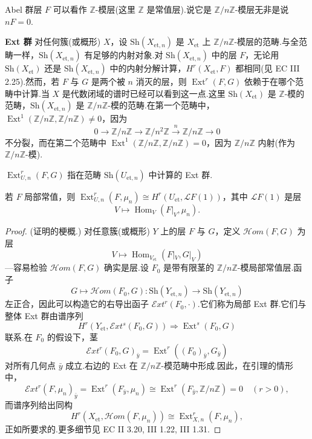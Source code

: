 Abel 群层 $F$ 可以看作 $\mathbb{Z}$-模层(这里 $\mathbb{Z}$ 是常值层).说它是 $\mathbb{Z}/n\mathbb{Z}$-模层无非是说 $nF = 0$.

\textbf{Ext 群} 对任何簇(或概形) $X$，设 $\mathrm{Sh}(X_{\mathrm{et}, n})$ 是 $X_{\mathrm{et}}$ 上 $\mathbb{Z}/n\mathbb{Z}$-模层的范畴.与全范畴一样，$\mathrm{Sh}(X_{\mathrm{et}, n})$ 有足够的内射对象.对 $\mathrm{Sh}(X_{\mathrm{et}, n})$ 中的层 $F$，无论用 $\mathrm{Sh}(X_{\mathrm{et}})$ 还是 $\mathrm{Sh}(X_{\mathrm{et}, n})$ 中的内射分解计算，$H^{r}(X_{\mathrm{et}}, F)$ 都相同(见 EC III 2.25).然而，若 $F$ 与 $G$ 是两个被 $n$ 消灭的层，则 $\operatorname{Ext}^{r}(F, G)$ 依赖于在哪个范畴中计算.当 $X$ 是代数闭域的谱时已经可以看到这一点.这里 $\mathrm{Sh}(X_{\mathrm{et}})$ 是 $\mathbb{Z}$-模的范畴，$\mathrm{Sh}(X_{\mathrm{et}, n})$ 是 $\mathbb{Z}/n\mathbb{Z}$-模的范畴.在第一个范畴中，$\operatorname{Ext}^{1}(\mathbb{Z}/n\mathbb{Z}, \mathbb{Z}/n\mathbb{Z}) \neq 0$，因为
\[
0 \to \mathbb{Z}/n\mathbb{Z} \to \mathbb{Z}/n^{2}\mathbb{Z} \xrightarrow{n} \mathbb{Z}/n\mathbb{Z} \to 0
\]
不分裂，而在第二个范畴中 $\operatorname{Ext}^{1}(\mathbb{Z}/n\mathbb{Z}, \mathbb{Z}/n\mathbb{Z}) = 0$，因为 $\mathbb{Z}/n\mathbb{Z}$ 内射(作为 $\mathbb{Z}/n\mathbb{Z}$-模).

$\operatorname{Ext}^{r}_{U, n}(F, G)$ 指在范畴 $\mathrm{Sh}(U_{\mathrm{et}, n})$ 中计算的 Ext 群.

\begin{lemma}\label{lem:14.21}
若 $F$ 局部常值，则 $\operatorname{Ext}^{r}_{U, n}(F, \mu_n) \cong H^{r}(U_{\mathrm{et}}, \mathcal{L}F(1))$，其中 $\mathcal{L}F(1)$ 是层
\[
V \mapsto \operatorname{Hom}_{V}(F|_{V}, \mu_n).
\]
\end{lemma}

\begin{proof}
(证明的梗概.) 对任意簇(或概形) $Y$ 上的层 $F$ 与 $G$，定义 $\mathcal{H}om(F, G)$ 为层
\[
V \mapsto \operatorname{Hom}_{V_{\mathrm{et}}}(F|_{V}, G|_{V})
\]
---容易检验 $\mathcal{H}om(F, G)$ 确实是层.设 $F_0$ 是带有限茎的 $\mathbb{Z}/n\mathbb{Z}$-模局部常值层.函子
\[
G \mapsto \mathcal{H}om(F_0, G) \colon \mathrm{Sh}(Y_{\mathrm{et}, n}) \to \mathrm{Sh}(Y_{\mathrm{et}, n})
\]
左正合，因此可以构造它的右导出函子 $\mathcal{E}xt^{r}(F_0, \cdot)$.它们称为局部 Ext 群.它们与整体 Ext 群由谱序列
\[
H^{r}(Y_{\mathrm{et}}, \mathcal{E}xt^{s}(F_0, G)) \Rightarrow \operatorname{Ext}^{s}(F_0, G)
\]
联系.在 $F_0$ 的假设下，茎
\[
\mathcal{E}xt^{r}(F_0, G)_{\bar{y}} = \operatorname{Ext}^{r}((F_0)_{\bar{y}}, G_{\bar{y}})
\]
对所有几何点 $\bar{y}$ 成立.右边的 Ext 在 $\mathbb{Z}/n\mathbb{Z}$-模范畴中形成.因此，在引理的情形中，
\[
\mathcal{E}xt^{r}(F, \mu_n)_{\bar{y}} = \operatorname{Ext}^{r}(F_{\bar{y}}, \mu_n) \cong \operatorname{Ext}^{r}(F_{\bar{y}}, \mathbb{Z}/n\mathbb{Z}) = 0 \quad (r > 0),
\]
而谱序列给出同构
\[
H^{r}(X_{\mathrm{et}}, \mathcal{H}om(F, \mu_n)) \cong \operatorname{Ext}^{r}_{X, n}(F, \mu_n),
\]
正如所要求的.更多细节见 EC II 3.20, III 1.22, III 1.31.
\end{proof}

